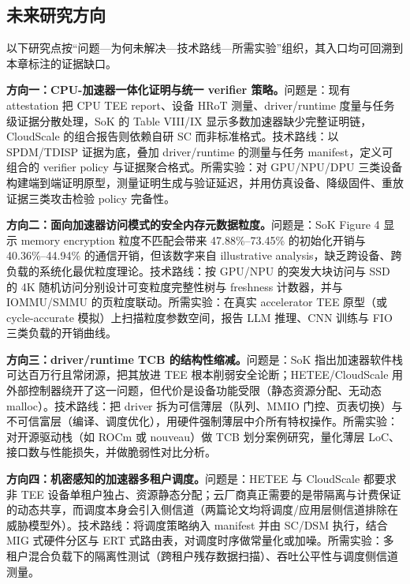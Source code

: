 \documentclass[11pt]{ctexart}
\begin{document}
\subsection{未来研究方向}
以下研究点按``问题—为何未解决—技术路线—所需实验''组织，其入口均可回溯到本章标注的证据缺口。\par
\noindent\textbf{方向一：CPU-加速器一体化证明与统一 verifier 策略。}问题是：现有 attestation 把 CPU TEE report、设备 HRoT 测量、driver/runtime 度量与任务级证据分散处理，SoK 的 Table VIII/IX 显示多数加速器缺少完整证明链\cite{sok-tee}，CloudScale 的组合报告则依赖自研 SC 而非标准格式\cite{dhar2024cloudscale}。技术路线：以 SPDM/TDISP 证据为底，叠加 driver/runtime 的测量与任务 manifest，定义可组合的 verifier policy 与证据聚合格式。所需实验：对 GPU/NPU/DPU 三类设备构建端到端证明原型，测量证明生成与验证延迟，并用仿真设备、降级固件、重放证据三类攻击检验 policy 完备性。\par
\noindent\textbf{方向二：面向加速器访问模式的安全内存元数据粒度。}问题是：SoK Figure 4 显示 memory encryption 粒度不匹配会带来 47.88\%--73.45\% 的初始化开销与 40.36\%--44.94\% 的通信开销\cite{sok-tee}，但该数字来自 illustrative analysis，缺乏跨设备、跨负载的系统化最优粒度理论。技术路线：按 GPU/NPU 的突发大块访问与 SSD 的 4K 随机访问分别设计可变粒度完整性树与 freshness 计数器，并与 IOMMU/SMMU 的页粒度联动。所需实验：在真实 accelerator TEE 原型（或 cycle-accurate 模拟）上扫描粒度参数空间，报告 LLM 推理、CNN 训练与 FIO 三类负载的开销曲线。\par
\noindent\textbf{方向三：driver/runtime TCB 的结构性缩减。}问题是：SoK 指出加速器软件栈可达百万行且常闭源，把其放进 TEE 根本削弱安全论断\cite{sok-tee}；HETEE/CloudScale 用外部控制器绕开了这一问题，但代价是设备功能受限（静态资源分配、无动态 malloc\cite{dhar2024cloudscale}）。技术路线：把 driver 拆为可信薄层（队列、MMIO 门控、页表切换）与不可信富层（编译、调度优化），用硬件强制薄层中介所有特权操作。所需实验：对开源驱动栈（如 ROCm 或 nouveau）做 TCB 划分案例研究，量化薄层 LoC、接口数与性能损失，并做脆弱性对比分析。\par
\noindent\textbf{方向四：机密感知的加速器多租户调度。}问题是：HETEE 与 CloudScale 都要求非 TEE 设备单租户独占、资源静态分配\cite{zhu2020hetee,dhar2024cloudscale}；云厂商真正需要的是带隔离与计费保证的动态共享，而调度本身会引入侧信道（两篇论文均将调度/应用层侧信道排除在威胁模型外）。技术路线：将调度策略纳入 manifest 并由 SC/DSM 执行，结合 MIG 式硬件分区与 ERT 式路由表，对调度时序做常量化或加噪。所需实验：多租户混合负载下的隔离性测试（跨租户残存数据扫描）、吞吐公平性与调度侧信道测量。\par
\end{document}
